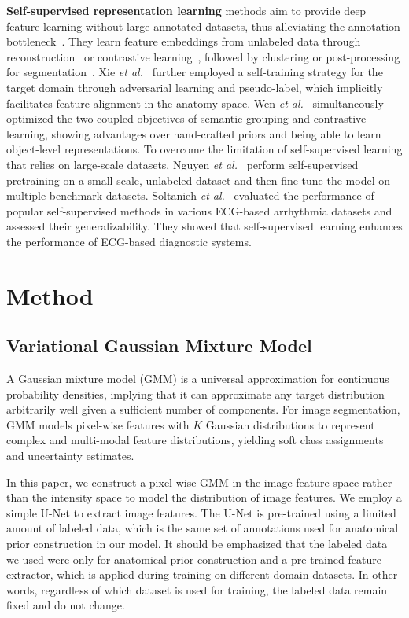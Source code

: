 \documentclass[preprint,12pt]{elsarticle}
\begin{document}
%
\textbf{Self-supervised representation learning} methods aim to provide deep feature learning without large annotated datasets, thus alleviating the annotation bottleneck~\cite{ericsson2022self}. 
They learn feature embeddings from unlabeled data through reconstruction~\cite{chang2022deeprecon,lu2022unsupervised} or contrastive learning~\cite{gu2024unsupervised,qiao2024cmrvae}, followed by clustering or post-processing for segmentation~\cite{bai2019self}.
%
Xie \textit{et al.}~\cite{xie2022unsupervised} further employed a self-training strategy for the target domain through adversarial learning and pseudo-label, which implicitly facilitates feature alignment in the anatomy space.
%
Wen \textit{et al.}~\cite{wen2022self} simultaneously optimized the two coupled objectives of semantic grouping and contrastive learning, showing advantages over hand-crafted priors and being able to learn object-level representations. 
%
To overcome the limitation of self-supervised learning that relies on large-scale datasets, Nguyen \textit{et al.}~\cite{nguyen2025matssl} perform self-supervised pretraining on a small-scale, unlabeled dataset and then fine-tune the model on multiple benchmark datasets. 
%
%
Soltanieh \textit{et al.}~\cite{soltanieh2023distribution} evaluated the performance of popular self-supervised methods in various ECG-based arrhythmia datasets and assessed their generalizability. They showed that self-supervised learning enhances the performance of ECG-based diagnostic systems. 



\section{Method}

\subsection{Variational Gaussian Mixture Model}

A Gaussian mixture model (GMM) is a universal approximation for continuous probability densities, implying that it can approximate any target distribution arbitrarily well given a sufficient number of components.
%
For image segmentation, GMM models pixel-wise features with $K$ Gaussian distributions to represent complex and multi-modal feature distributions, yielding soft class assignments and uncertainty estimates.

In this paper, we construct a pixel-wise GMM in the image feature space rather than the intensity space to model the distribution of image features. 
We employ a simple U-Net to extract image features. The U-Net is pre-trained using a limited amount of labeled data, which is the same set of annotations used for anatomical prior construction in our model.
%
It should be emphasized that the labeled data we used were only for anatomical prior construction and a pre-trained feature extractor, which is applied during training on different domain datasets. In other words, regardless of which dataset is used for training, the labeled data remain fixed and do not change.
\end{document}
